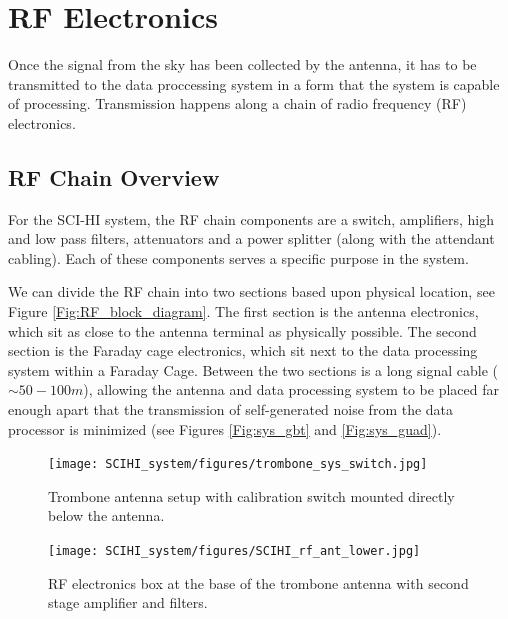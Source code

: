 \section{RF Electronics}

Once the signal from the sky has been collected by the antenna, it has to be transmitted to the data proccessing system in a form that the system is capable of processing. Transmission happens along a chain of radio frequency (RF) electronics. 

\subsection{RF Chain Overview}
For the SCI-HI system, the RF chain components are a switch, amplifiers, high and low pass filters, attenuators and a power splitter (along with the attendant cabling). Each of these components serves a specific purpose in the system. 

We can divide the RF chain into two sections based upon physical location, see Figure \ref{Fig:RF_block_diagram}. The first section is the antenna electronics, which sit as close to the antenna terminal as physically possible. The second section is the Faraday cage electronics, which sit next to the data processing system within a Faraday Cage. Between the two sections is a long signal cable ($\sim50-100 m$), allowing the antenna and data processing system to be placed far enough apart that the transmission of self-generated noise from the data processor is minimized (see Figures \ref{Fig:sys_gbt} and \ref{Fig:sys_guad}).

\begin{figure}[htb]
\centering
\begin{minipage}[b]{0.47\textwidth}
\centering
\texttt{[image: SCIHI\_system/figures/trombone\_sys\_switch.jpg]}
\caption{Trombone antenna setup with calibration switch mounted directly below the antenna.}
\label{Fig:trombone_switch}
\end{minipage}%
\begin{minipage}[b]{0.02\textwidth}
\hspace{1cm}
\end{minipage}%
\begin{minipage}[b]{0.47\textwidth}
\centering
\texttt{[image: SCIHI\_system/figures/SCIHI\_rf\_ant\_lower.jpg]}
\caption{RF electronics box at the base of the trombone antenna with second stage amplifier and filters.}
\label{Fig:trombone_base}
\end{minipage}
\end{figure}

